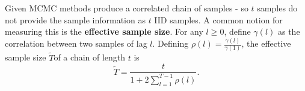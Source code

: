 \begin{defn}
  \label{sec:bayes-infer-assoc-4}
  Given MCMC methods produce a correlated chain of samples - so $t$
  samples do not provide the sample information as $t$ IID samples.  A
  common notion for measuring this is the \textbf{effective sample
    size}.  For any $l \geq 0$, define $\gamma(l)$ as the correlation
  between two samples of lag $l$.  Defining $\rho(l) =
  \frac{\gamma(l)}{\gamma(1)}$, the effective sample size $\tilde T$of
  a chain of length $t$ is
  \begin{equation}
    \label{eq:8}
    \tilde T = \frac{t}{1 + 2 \sum_{l=1}^{T-1} \rho(l)}.
  \end{equation}
\end{defn}




